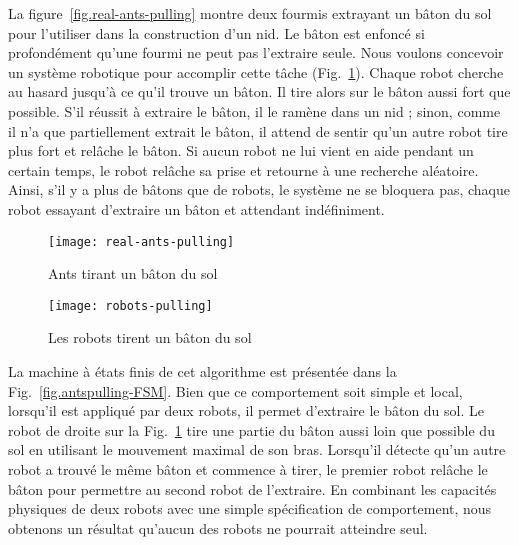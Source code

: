 La figure~\ref{fig.real-ants-pulling} montre deux fourmis extrayant un bâton du sol pour l'utiliser dans la construction d'un nid. Le bâton est enfoncé si profondément qu'une fourmi ne peut pas l'extraire seule. Nous voulons concevoir un système robotique pour accomplir cette tâche (Fig.~\ref{fig.robots-pulling}). Chaque robot cherche au hasard jusqu'à ce qu'il trouve un bâton. Il tire alors sur le bâton aussi fort que possible. S'il réussit à extraire le bâton, il le ramène dans un nid ; sinon, comme il n'a que partiellement extrait le bâton, il attend de sentir qu'un autre robot tire plus fort et relâche le bâton. Si aucun robot ne lui vient en aide pendant un certain temps, le robot relâche sa prise et retourne à une recherche aléatoire. Ainsi, s'il y a plus de bâtons que de robots, le système ne se bloquera pas, chaque robot essayant d'extraire un bâton et attendant indéfiniment.

\begin{figure}
\begin{minipage}{.45\textwidth}
\texttt{[image: real-ants-pulling]}
\caption{Ants tirant un bâton du sol}
\label{fig.real-ants-pulling}
\end{minipage}
\hspace{\fill}
\begin{minipage}{.45\textwidth}
\texttt{[image: robots-pulling]}
\caption{Les robots tirent un bâton du sol}
\label{fig.robots-pulling}
\end{minipage}
\end{figure}

La machine à états finis de cet algorithme est présentée dans la Fig.~\ref{fig.antspulling-FSM}. Bien que ce comportement soit simple et local, lorsqu'il est appliqué par deux robots, il permet d'extraire le bâton du sol. Le robot de droite sur la Fig.~\ref{fig.robots-pulling} tire une partie du bâton aussi loin que possible du sol en utilisant le mouvement maximal de son bras. Lorsqu'il détecte qu'un autre robot a trouvé le même bâton et commence à tirer, le premier robot relâche le bâton pour permettre au second robot de l'extraire. En combinant les capacités physiques de deux robots avec une simple spécification de comportement, nous obtenons un résultat qu'aucun des robots ne pourrait atteindre seul.

